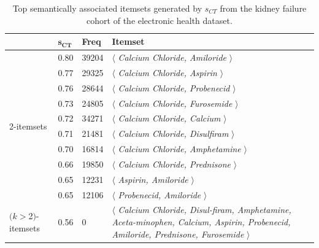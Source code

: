 \begin{table}
\begin{center}
\begin{tabular}{l|l |l |l }
  \hline
&$\mathbf{s_{CT}}$      &\textbf{Freq}&   \textbf{Itemset}\\
  \hline\hline
\multirow{10}{*}{2-itemsets}& 0.80	&	39204		&$\langle$\emph{	Calcium Chloride,	Amiloride	}$\rangle$\\
&0.77	&	29325		&$\langle$\emph{	Calcium Chloride,	Aspirin	}$\rangle$\\
&0.76	&	28644		&$\langle$\emph{	Calcium Chloride,	Probenecid	}$\rangle$\\
&0.73	&	24805		&$\langle$\emph{	Calcium Chloride,	Furosemide	}$\rangle$\\
&0.72	&	34271		&$\langle$\emph{	Calcium Chloride,	Calcium	}$\rangle$\\
&0.71	&	21481		&$\langle$\emph{	Calcium Chloride,	Disulfiram	}$\rangle$\\
&0.70	&	16814		&$\langle$\emph{	Calcium Chloride,	Amphetamine	}$\rangle$\\
&0.66	&	19850		&$\langle$\emph{	Calcium Chloride,	Prednisone	}$\rangle$\\
&0.65	&	12231		&$\langle$\emph{	Aspirin,	Amiloride	}$\rangle$\\
&0.65	&	12106		&$\langle$\emph{	Probenecid,	Amiloride	}$\rangle$\\
  \hline
\parbox{1cm}{$(k$$>$2$)$-itemsets}&0.56	&	0	&	\parbox{6cm}{$\langle$\emph{	Calcium Chloride, Disul-firam, Amphetamine, Aceta-minophen, Calcium, Aspirin, Probenecid, Amiloride, Prednisone, Furosemide	}$\rangle$}\\
\hline
\end{tabular}
\end{center}
\caption[Top $s_{CT}$ results on the kidney failure cohort dataset.]{\label{tbl:ncbo_ct} Top semantically associated itemsets generated by $s_{CT}$ from the kidney failure cohort of the electronic health dataset.}
\end{table}


